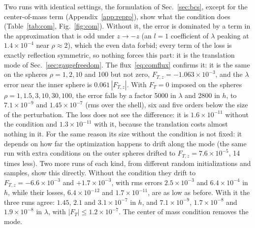 \documentclass[aps,prd,twocolumn,superscriptaddress, nofootinbib,floatfix]{revtex4-2}
\begin{document}
Two runs with identical settings, the formulation of Sec.~\ref{sec:bcs}, except for the center-of-mass term (Appendix~\ref{app:repro}), show what the condition does (Table~\ref{tab:com}, Fig.~\ref{fig:com}).
Without it, the error is dominated by a term in the approximation that is odd under $z\to-z$ (an $l=1$ coefficient of $\lambda$ peaking at $1.4\times10^{-4}$ near $\rho\approx2$), which the even data forbid; every term of the loss is exactly reflection symmetric, so nothing forces this part: it is the translation mode of Sec.~\ref{sec:gaugefreedom}.
The flux~\eqref{eq:comflux} confirms it: it is the same on the spheres $\rho = 1, 2, 10$ and 100 but not zero, $F_{T,z} = -1.063\times10^{-3}$, and the $\lambda$ error near the inner sphere is $0.061\,|F_{T,z}|$.
With $F_T = 0$ imposed on the spheres $\rho = 1, 1.5, 3, 10, 30, 100$, the error falls by a factor 5000 in $\lambda$ and 2800 in $h$, to $7.1\times10^{-9}$ and $1.45\times10^{-7}$ (rms over the shell), six and five orders below the size of the perturbation.
The loss does not see the difference: it is $1.6\times10^{-11}$ without the condition and $1.3\times10^{-11}$ with it, because the translation costs almost nothing in it.
For the same reason its size without the condition is not fixed: it depends on how far the optimization happens to drift along the mode (the same run with extra conditions on the outer spheres drifted to $F_{T,z} = 7.6\times10^{-5}$, 14 times less).
Two more runs of each kind, from different random initializations and samples, show this directly.
Without the condition they drift to $F_{T,z} = -6.6\times10^{-3}$ and $+1.7\times10^{-3}$, with rms errors $2.5\times10^{-3}$ and $6.4\times10^{-4}$ in $h$, while their losses, $6.4\times10^{-12}$ and $1.7\times10^{-11}$, are as low as before.
With it the three runs agree: $1.45$, $2.1$ and $3.1\times10^{-7}$ in $h$, and $7.1\times10^{-9}$, $1.7\times10^{-8}$ and $1.9\times10^{-8}$ in $\lambda$, with $|F_T|\le1.2\times10^{-7}$.
The center of mass condition removes the mode.
\end{document}
